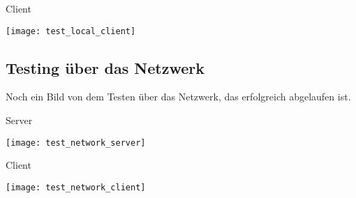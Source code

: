 \documentclass[11pt]{article}
\begin{document}
Client
\begin{center}
  \texttt{[image: test\_local\_client]}
\end{center}

\subsection{Testing über das Netzwerk}
Noch ein Bild von dem Testen über das Netzwerk, das erfolgreich abgelaufen ist.

Server
\begin{center}
  \texttt{[image: test\_network\_server]}
\end{center}

Client
\begin{center}
  \texttt{[image: test\_network\_client]}
\end{center}

{}


\end{document}
